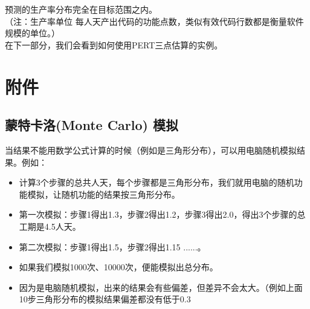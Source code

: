 预测的生产率分布完全在目标范围之内。\\
（注：生产率单位 每人天产出代码的功能点数，类似有效代码行数都是衡量软件规模的单位。）\\
在下一部分，我们会看到如何使用PERT三点估算的实例。

\hypertarget{ux9644ux4ef6}{%
\section{附件}\label{ux9644ux4ef6}}

\hypertarget{ux8499ux7279ux5361ux6d1bmonte-carlo-ux6a21ux62df}{%
\subsection{蒙特卡洛(Monte Carlo)
模拟}\label{ux8499ux7279ux5361ux6d1bmonte-carlo-ux6a21ux62df}}

当结果不能用数学公式计算的时候（例如是三角形分布），可以用电脑随机模拟结果。例如：

\begin{itemize}
\tightlist
\item
  计算3个步骤的总共人天，每个步骤都是三角形分布，我们就用电脑的随机功能模拟，让随机功能的结果按三角形分布。
\item
  第一次模拟：步骤1得出1.3，步骤2得出1.2，步骤3得出2.0，得出3个步骤的总工期是4.5人天。
\item
  第二次模拟：步骤1得出1.5，步骤2得出1.15 ......。
\item
  如果我们模拟1000次、10000次，便能模拟出总分布。
\item
  因为是电脑随机模拟，出来的结果会有些偏差，但差异不会太大。（例如上面10步三角形分布的模拟结果偏差都没有低于0.3%
\end{itemize}


